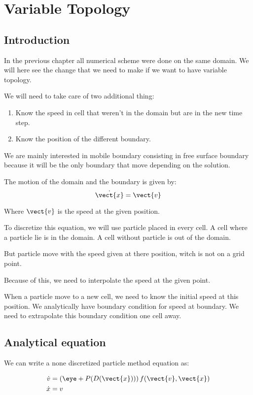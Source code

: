 \chapter{Variable Topology}

\section{Introduction}
In the previous chapter all numerical scheme were done on the same domain.
We will here see the change that we need to make if we want to have variable topology.


We will need to take care of two additional thing:
\begin{enumerate}
\item Know the speed in cell that weren't in the domain but are in the new time step.
\item Know the position of the different boundary.
\end{enumerate}

We are mainly interested in mobile boundary consisting in free surface boundary because it will be the only
boundary that move depending on the solution.

The motion of the domain and the boundary is given by:
\begin{equation}
\dot{\vect{x}}=\vect{v}
\end{equation}

Where $\vect{v}$ is the speed at the given position.

To discretize this equation, we will use particle  placed in every cell. A cell where a particle lie is in the domain.
A cell without particle is out of the domain.

But particle move with the speed given at there position, witch is not on a grid point.

Because of this, we need to interpolate the speed at the given point.

When a particle move to a new cell, we need to know the initial speed at this position.
We analytically have boundary condition for speed at boundary.
We need to extrapolate this boundary condition one cell away.

\section{Analytical equation}

We can write a none discretized particle method equation as:

\begin{align*}
	\dot{v}&=\left(\eye + P(D(\vect{x}))\right)f(\vect{v},\vect{x})\\
	\dot{x}&=v
\end{align*}


